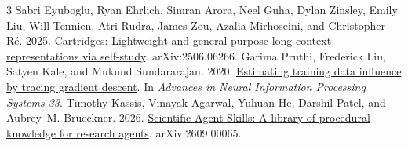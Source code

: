 \documentclass[11pt]{article}
\begin{document}
\begin{thebibliography}{3}
Sabri Eyuboglu, Ryan Ehrlich, Simran Arora, Neel Guha, Dylan Zinsley, Emily Liu, Will Tennien, Atri Rudra, James Zou, Azalia Mirhoseini, and Christopher R\'{e}. 2025.
\newblock \href{https://arxiv.org/abs/2506.06266}{Cartridges: Lightweight and general-purpose long context representations via self-study}.
\newblock arXiv:2506.06266.
Garima Pruthi, Frederick Liu, Satyen Kale, and Mukund Sundararajan. 2020.
\newblock \href{https://proceedings.neurips.cc/paper/2020/hash/e6385d39ec9394f2f3a354d9d2b88eec-Abstract.html}{Estimating training data influence by tracing gradient descent}.
\newblock In \emph{Advances in Neural Information Processing Systems 33}.
Timothy Kassis, Vinayak Agarwal, Yuhuan He, Darshil Patel, and Aubrey~M. Brueckner. 2026.
\newblock \href{https://doi.org/10.48550/arXiv.2609.00065}{Scientific Agent Skills: A library of procedural knowledge for research agents}.
\newblock arXiv:2609.00065.
\end{thebibliography}
\end{document}

